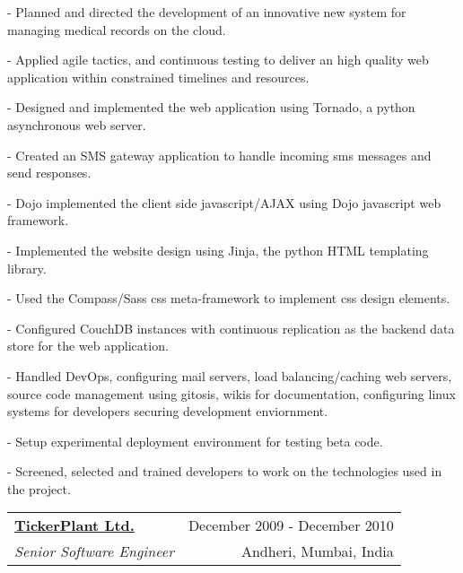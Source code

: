 \documentclass[10pt]{article}
\makeatletter
\newcommand{\employer}[4]{ 
        \vspace*{6pt}
	\begin{tabular*}{\textwidth}{l@{\extracolsep{\fill}}r}
	\textbf{#1} & #2 \\
                #3  & #4 \\ 
	\end{tabular*}
}
\newenvironment{achievements}{
        \vspace{-0pt}
        \begin{list}
        {}
        {\topsep 0pt \itemsep -3pt}
}
{
        \end{list}
}
\makeatother
\begin{document}
	\begin{achievements}
                \item[-] Planned and directed the development of an innovative new system for managing medical records on the cloud.
                \item[-] Applied agile tactics, and continuous testing to deliver an high quality web application within constrained timelines and resources.
                \item[-] Designed and implemented the web application using Tornado, a python asynchronous web server.
                \item[-] Created an SMS gateway application to handle incoming sms messages and send responses.
                \item[-] Dojo implemented the client side javascript/AJAX using Dojo javascript web framework.
                \item[-] Implemented the website design using Jinja, the python HTML templating library.
                \item[-] Used the Compass/Sass css meta-framework to implement css design elements.
                \item[-] Configured CouchDB instances with continuous replication as the backend data store for the web application.
                \item[-] Handled DevOps, configuring mail servers, load balancing/caching web servers, source code management using gitosis, wikis for documentation, configuring linux systems for developers securing development enviornment.
                \item[-] Setup experimental deployment environment for testing beta code.
                \item[-] Screened, selected and trained developers to work on the technologies used in the project.
	\end{achievements}
\employer{\href{http://www.Tickerplantindia.com/}{TickerPlant Ltd.}}{December 2009 - December 2010}{\emph{Senior Software Engineer}} {Andheri, Mumbai, India}
\end{document}

